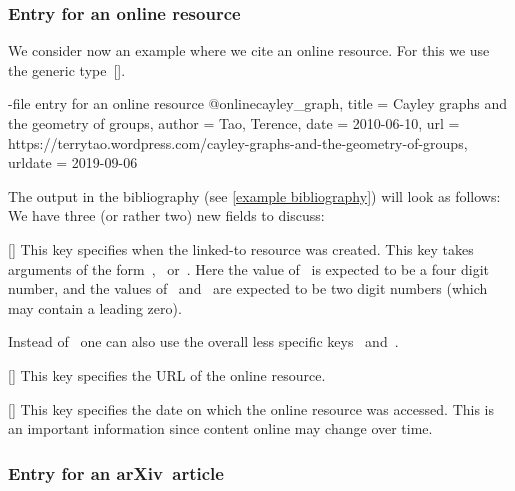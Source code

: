 \subsubsection{Entry for an online resource}

We consider now an example where we cite an online resource.
For this we use the generic type~[\atname].
\begin{showcode}[label = {bib entry online}]{-file entry for an online resource}
@online{cayley_graph,
  title   = {Cayley graphs and the geometry of groups},
  author  = {Tao, Terence},
  date    = {2010-06-10},
  url     = {https://terrytao.wordpress.com/cayley-graphs-and-the-geometry-of-groups},
  urldate = {2019-09-06}
}
\end{showcode}
The output in the bibliography (see \cref{example bibliography}) will look as follows:
We have three (or rather two) new fields to discuss:
\begin{mydescription}
  \item[\optname{date}]
    [\optname]
    This key specifies when the linked-to resource was created.
    This key takes arguments of the form~,~ or~.
    Here the value of~ is expected to be a four digit number, and the values of~ and~ are expected to be two digit numbers (which may contain a leading zero).
    
    Instead of~ one can also use the overall less specific keys~ and~.
  \item[\optname{url}]
    [\optname]
    This key specifies the URL of the online resource.
  \item[\optname{urldate}]
    [\optname]
    This key specifies the date on which the online resource was accessed.
    This is an important information since content online may change over time.
\end{mydescription}

\subsubsection{Entry for an arXiv~article}

